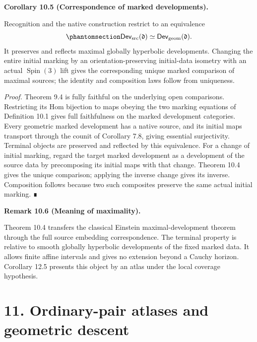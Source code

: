 \documentclass[
  english,
  11pt,
  reqno]{amsart}
\makeatletter
\newcommand{\pandocstatementheading}[1]{%
  \par\addpenalty{\@beginparpenalty}%
  \addvspace{.5\baselineskip plus .2\baselineskip minus .2\baselineskip}%
  {\normalfont\bfseries #1\par}%
  \nobreak\@afterindenttrue\@afterheading
}
\makeatother
\begin{document}
\pandocstatementheading{\protect{}\label{cor:global-marked-development-correspondence}Corollary 10.5 (Correspondence of marked developments).}

Recognition and the native construction restrict to an equivalence
\begin{equation}\protect\phantomsection\label{eq:global-marked-development-equivalence}{
\mathsf{Dev}_{\mathrm{src}}(\mathfrak d)
\simeq
\mathsf{Dev}_{\mathrm{geom}}(\mathfrak d).
}\end{equation} It preserves and reflects maximal globally hyperbolic
developments. Changing the entire initial marking by an
orientation-preserving initial-data isometry with an actual
\(\operatorname{Spin}(3)\) lift gives the corresponding unique marked
comparison of maximal sources; the identity and composition laws follow
from uniqueness.

\emph{Proof.} Theorem 9.4 is fully faithful on the underlying open
comparisons. Restricting its Hom bijection to maps obeying the two
marking equations of Definition 10.1 gives full faithfulness on the
marked development categories. Every geometric marked development has a
native source, and its initial maps transport through the counit of
Corollary 7.8, giving essential surjectivity. Terminal objects are
preserved and reflected by this equivalence. For a change of initial
marking, regard the target marked development as a development of the
source data by precomposing its initial maps with that change. Theorem
10.4 gives the unique comparison; applying the inverse change gives its
inverse. Composition follows because two such composites preserve the
same actual initial marking. ∎

\pandocstatementheading{\protect{}\label{rem:global-maximal-source-scope}Remark 10.6 (Meaning of maximality).}

Theorem 10.4 transfers the classical Einstein maximal-development
theorem through the full source embedding correspondence. The terminal
property is relative to smooth globally hyperbolic developments of the
fixed marked data. It allows finite affine intervals and gives no
extension beyond a Cauchy horizon. Corollary 12.5 presents this object
by an atlas under the local coverage hypothesis.

\protect{}\label{sec:global-ordinary-pair-atlases}

\section{11. Ordinary-pair atlases and geometric
descent}\label{ordinary-pair-atlases-and-geometric-descent}
\end{document}
